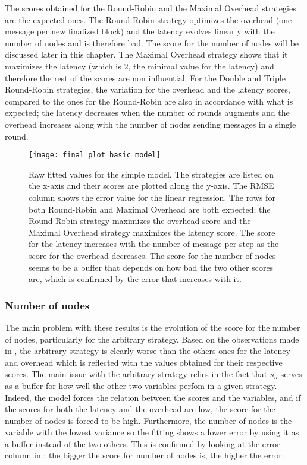 The scores obtained for the Round-Robin and the Maximal Overhead strategies are
the expected ones. The Round-Robin strategy optimizes the overhead (one message
per new finalized block) and the latency evolves linearly with the number of
nodes and is therefore bad. The score for the number of nodes will be discussed
later in this chapter. The Maximal Overhead strategy shows that it maximizes the
latency (which is \(2\), the minimal value for the latency) and therefore the
rest of the scores are non influential.
For the Double and Triple Round-Robin strategies, the variation for the overhead
and the latency scores, compared to the ones for the Round-Robin are also in
accordance with what is expected; the latency decreases when the number of
rounds augments and the overhead increases along with the number of nodes
sending messages in a single round.

\begin{figure}[h]
    \centering
    \texttt{[image: final\_plot\_basic\_model]}
    \caption{Raw fitted values for the simple model. The strategies are listed
    on the x-axis and their scores are plotted along the y-axis. The RMSE column shows the error value for the linear
        regression. The rows for both Round-Robin and Maximal Overhead are both
        expected; the Round-Robin strategy maximizes the overhead score and the
        Maximal Overhead strategy maximizes the latency score. The score for the
        latency increases with the number of message per step as the score for
        the overhead decreases. The score for the number of nodes seems to be a
        buffer that depends on how bad the two other scores are, which is
        confirmed by the error that increases with it.
    }
    \label{fig:recapTestsPlot}
\end{figure}

\subsubsection{Number of nodes}
\label{ssec:nbNodes}
The main problem with these results is the evolution of the score for the number
of nodes, particularly for the arbitrary strategy. Based on the observations
made in , the arbitrary strategy is clearly worse than the
others ones for the latency and overhead which is reflected with the values
obtained for their respective scores. The main issue with the arbitrary strategy
relies in the fact that \(s_n\) serves as a buffer for how well the other two
variables perfom in a given strategy.  Indeed, the model forces the relation
between the scores and the variables, and if the scores for both the latency and
the overhead are low, the score for the number of nodes is forced to be high.
Furthermore, the number of nodes is the variable with the lowest variance so the
fitting shows a lower error by using it as a buffer instead of the two others.
This is confirmed by looking at the error column in ; the
bigger the score for number of nodes is, the higher the error. 

